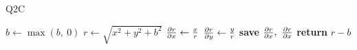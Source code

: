 \begin{algorithm}[tb]
\caption{Q2C}\label{alg:ch3:q2c}
\begin{algorithmic}[1]
  \State $b \gets \max(b,\ 0)$
  \State $r \gets \sqrt{x^2 + y^2 + b^2}$
  \State $\frac{\partial r}{\partial x} \gets \frac{x}{r}$
  \State $\frac{\partial r}{\partial y} \gets \frac{y}{r}$
  \State \textbf{save} $\dydx{r}{x},\ \dydx{r}{x}$
  \State \textbf{return} $r - b$
\EndFunction
\end{algorithmic}\vspace{10pt}
\end{algorithm}
